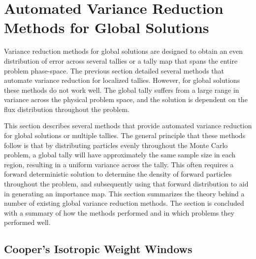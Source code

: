 \section{Automated Variance Reduction Methods for Global Solutions}
\label{sec:GlobalVR}

Variance reduction methods for global solutions are designed to obtain an even
distribution of error across several tallies or a tally map that spans the
entire problem phase-space.
The previous section detailed several methods that automate variance reduction
for localized tallies. However, for global solutions these methods do not work
well. The global tally suffers from a large range in variance across the
physical problem space, and the solution is dependent on the flux distribution
throughout the problem.

This section describes several methods that provide
automated variance reduction for global solutions or multiple tallies. The
general principle that these methods follow is that by distributing particles
evenly throughout the Monte Carlo problem, a global tally will have
approximately the same sample size in each region, resulting in a uniform
variance across the tally. This often requires a forward deterministic solution
to determine the density of forward particles throughout the problem, and
subsequently using that forward distribution to aid in generating an
importance map. This
section summarizes the theory behind a number of existing global variance
reduction methods. The section is concluded with a summary of how the
methods performed and in which problems they performed well.

\subsection{Cooper's Isotropic Weight Windows}
\label{subsec:CooperGlobal}

